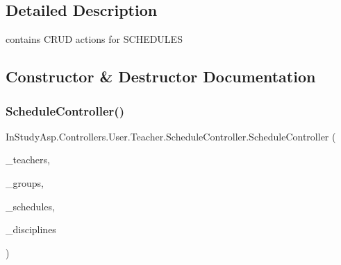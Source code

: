 \subsection{Detailed Description}
contains C\+R\+UD actions for S\+C\+H\+E\+D\+U\+L\+ES 

\subsection{Constructor \& Destructor Documentation}
\mbox{\label{class_in_study_asp_1_1_controllers_1_1_user_1_1_teacher_1_1_schedule_controller_aa5f4315593095a1c5065795fbf082a6c}} 
\subsubsection{\texorpdfstring{Schedule\+Controller()}{ScheduleController()}}
{\footnotesize\ttfamily In\+Study\+Asp.\+Controllers.\+User.\+Teacher.\+Schedule\+Controller.\+Schedule\+Controller (\begin{DoxyParamCaption}\item[{\hyperlink{interface_repo_1_1_common_1_1_i_generic_repository}{I\+Generic\+Repository}$<$ \hyperlink{class_e_f_oracle_1_1_model_1_1_t_e_a_c_h_e_r}{T\+E\+A\+C\+H\+ER} $>$}]{\+\_\+teachers,  }\item[{\hyperlink{interface_repo_1_1_common_1_1_i_generic_repository}{I\+Generic\+Repository}$<$ \hyperlink{class_e_f_oracle_1_1_model_1_1_g_r_o_u_p}{G\+R\+O\+UP} $>$}]{\+\_\+groups,  }\item[{\hyperlink{class_repo_1_1_schedule_repository}{Schedule\+Repository}}]{\+\_\+schedules,  }\item[{\hyperlink{interface_repo_1_1_common_1_1_i_generic_repository}{I\+Generic\+Repository}$<$ \hyperlink{class_e_f_oracle_1_1_model_1_1_d_i_s_c_i_p_l_i_n_e}{D\+I\+S\+C\+I\+P\+L\+I\+NE} $>$}]{\+\_\+disciplines }\end{DoxyParamCaption})}



